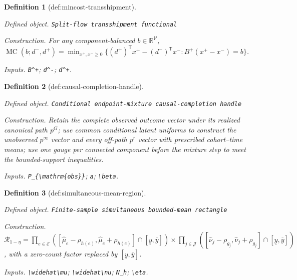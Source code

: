 \documentclass{article}
\newtheorem{definition}{Definition}
\begin{document}
\begin{definition}[def:mincost-transshipment]\label{def:mincost-transshipment}
\par\smallskip\noindent\emph{Defined object.} \texttt{Split-\allowbreak{}flow transshipment functional}
\par\smallskip\noindent\emph{Construction.} For any component-balanced \(b\in\mathbb R^{\mathcal V}\), \(\operatorname{MC}(b;d^-,d^+)=\min_{x^+,x^-\ge0}\{(d^+)^{\mathsf T}x^+-(d^-)^{\mathsf T}x^-:B^+(x^+-x^-)=b\}\).
\par\smallskip\noindent\emph{Inputs.} \texttt{B\textasciicircum{}+\allowbreak{}}; \texttt{d\textasciicircum{}-\allowbreak{}}; \texttt{d\textasciicircum{}+\allowbreak{}}.
\end{definition}

\begin{definition}[def:causal-completion-handle]\label{def:causal-completion-handle}
\par\smallskip\noindent\emph{Defined object.} \texttt{Conditional endpoint-\allowbreak{}mixture causal-\allowbreak{}completion handle}
\par\smallskip\noindent\emph{Construction.} Retain the complete observed outcome vector under its realized canonical path \(p^G\); use common conditional latent uniforms to construct the unobserved \(p^\infty\) vector and every off-path \(p^r\) vector with prescribed cohort--time means; use one gauge per connected component before the mixture step to meet the bounded-support inequalities.
\par\smallskip\noindent\emph{Inputs.} \texttt{P\_\allowbreak{}\{\textbackslash{}\allowbreak{}mathrm\{obs\}\allowbreak{}\}\allowbreak{}}; \texttt{a}; \texttt{\textbackslash{}\allowbreak{}beta}.
\end{definition}

\begin{definition}[def:simultaneous-mean-region]\label{def:simultaneous-mean-region}
\par\smallskip\noindent\emph{Defined object.} \texttt{Finite-\allowbreak{}sample simultaneous bounded-\allowbreak{}mean rectangle}
\par\smallskip\noindent\emph{Construction.} \(\mathcal R_{1-\eta}=\prod_{e\in\mathcal E}([\widehat\mu_e-\rho_{h(e)},\widehat\mu_e+\rho_{h(e)}]\cap[\underline y,\overline y])\times\prod_{j\in\mathcal J}([\widehat\nu_j-\rho_{g_j},\widehat\nu_j+\rho_{g_j}]\cap[\underline y,\overline y])\), with a zero-count factor replaced by \([\underline y,\overline y]\).
\par\smallskip\noindent\emph{Inputs.} \texttt{\textbackslash{}\allowbreak{}widehat\textbackslash{}\allowbreak{}mu}; \texttt{\textbackslash{}\allowbreak{}widehat\textbackslash{}\allowbreak{}nu}; \texttt{N\_\allowbreak{}h}; \texttt{\textbackslash{}\allowbreak{}eta}.
\end{definition}
\end{document}
